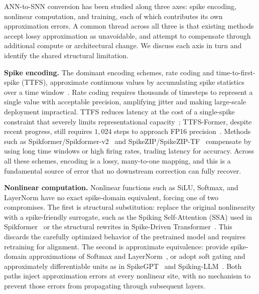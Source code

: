 \documentclass{article}
\theoremstyle{plain}
\theoremstyle{definition}
\theoremstyle{remark}
\begin{document}
ANN-to-SNN conversion has been studied along three axes: spike encoding, nonlinear
computation, and training, each of which contributes its own approximation errors.
A common thread across all three is that existing methods accept lossy approximation
as unavoidable, and attempt to compensate through additional compute or architectural
change. We discuss each axis in turn and identify the shared structural limitation.

\noindent\textbf{Spike encoding.}
The dominant encoding schemes, rate coding and time-to-first-spike
(TTFS), approximate continuous values by accumulating spike statistics over a time
window~\citep{rueckauer2017conversion,auge2021encoding,guo2021coding}. Rate coding
requires thousands of timesteps to represent a single value with acceptable precision,
amplifying jitter and making large-scale deployment impractical. TTFS reduces latency
at the cost of a single-spike constraint that severely limits representational
capacity~\citep{bonilla2022ttfs,stanojevic2024ttfs}; TTFS-Former, despite recent
progress, still requires $1{,}024$ steps to approach FP16
precision~\citep{ZhaoHuangDingYu2025_TTFSFormer}. Methods such as
Spikformer/Spikformer-v2~\citep{zhou2023spikformer,zhou2024spikformerv2} and
SpikeZIP/SpikeZIP-TF~\citep{you2024spikeziptf} compensate by using long time windows
or high firing rates, trading latency for accuracy. Across all these schemes, encoding
is a lossy, many-to-one mapping, and this is a fundamental source of error that no
downstream correction can fully recover.

\noindent\textbf{Nonlinear computation.}
Nonlinear functions such as SiLU, Softmax, and LayerNorm have no exact spike-domain
equivalent, forcing one of two compromises. The first is structural substitution:
replace the original nonlinearity with a spike-friendly surrogate, such as the
Spiking Self-Attention (SSA) used in Spikformer~\citep{zhou2023spikformer} or the
structural rewrites in Spike-Driven
Transformer~\citep{yao2023sdt,spikedattention2024,wang2023stsa}. This discards the
carefully optimized behavior of the pretrained model and requires retraining for
alignment. The second is approximate equivalence: provide spike-domain approximations
of Softmax and LayerNorm~\citep{you2024spikeziptf,tang2024sorbet}, or adopt soft
gating and approximately differentiable units as in SpikeGPT~\citep{zhu2023spikegpt}
and Spiking-LLM~\citep{xing2025spikellm}. Both paths inject approximation errors at
every nonlinear site, with no mechanism to prevent those errors from propagating
through subsequent layers.
\end{document}
